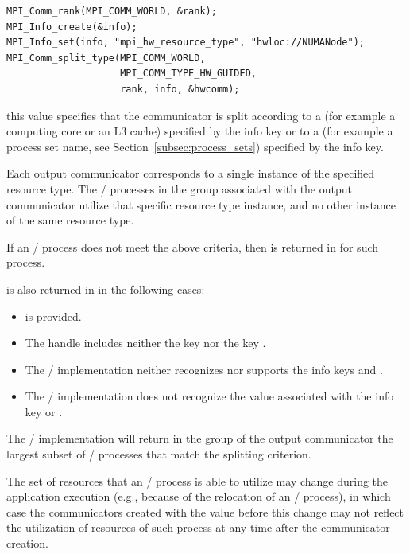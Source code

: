 \begin{description}
\begin{example}
\begin{lstlisting}[language={[MPI]C}]
MPI_Comm_rank(MPI_COMM_WORLD, &rank);
MPI_Info_create(&info);
MPI_Info_set(info, "mpi_hw_resource_type", "hwloc://NUMANode");
MPI_Comm_split_type(MPI_COMM_WORLD,
                    MPI_COMM_TYPE_HW_GUIDED,
                    rank, info, &hwcomm);
\end{lstlisting}
\end{example}

\item[\mpiconstmain{MPI\_COMM\_TYPE\_RESOURCE\_GUIDED}:]this
  value specifies that the communicator  is split according to a
   (for example a computing core or an L3 cache)
  specified by the  info key or to a 
  (for example a process set name, see Section~\ref{subsec:process_sets})
  specified by the  info key.

  Each output communicator  corresponds to a single instance of the specified resource type.
  The \MPI/ processes in the group associated with the output communicator 
  utilize that specific resource type instance, and no other instance of the same resource type.

  If an \MPI/ process does not meet the above criteria, then  is returned
  in  for such process.

   is also returned in  in the following cases:
  \begin{itemize}
  \item {} is provided.
  \item The  handle includes neither the key  nor the key .
  \item The \MPI/ implementation neither recognizes nor supports the info keys  and .
  \item The \MPI/ implementation does not recognize the value associated with the info key  or .
  \end{itemize}

  The \MPI/ implementation will return in the group of the output communicator 
  the largest subset of \MPI/ processes that match the splitting criterion.

  \begin{users}
    The set of resources that an \MPI/ process is able to utilize may change during the
    application execution (e.g., because of the relocation of an \MPI/ process), in which case the communicators
    created with the value  before this change may not reflect
    the utilization of resources of such process at any time after the communicator creation.
  \end{users}


\end{description}
